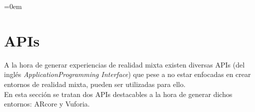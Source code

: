 \parindent=0em
\section{APIs}
\noindent
A la hora de generar experiencias de realidad mixta existen diversas APIs (del inglés \textit{ApplicationProgramming Interface}) que pese a no estar enfocadas en crear entornos de realidad mixta, pueden ser utilizadas para ello.\\

En esta sección se tratan dos APIs destacables a la hora de generar dichos entornos: ARcore y Vuforia.


